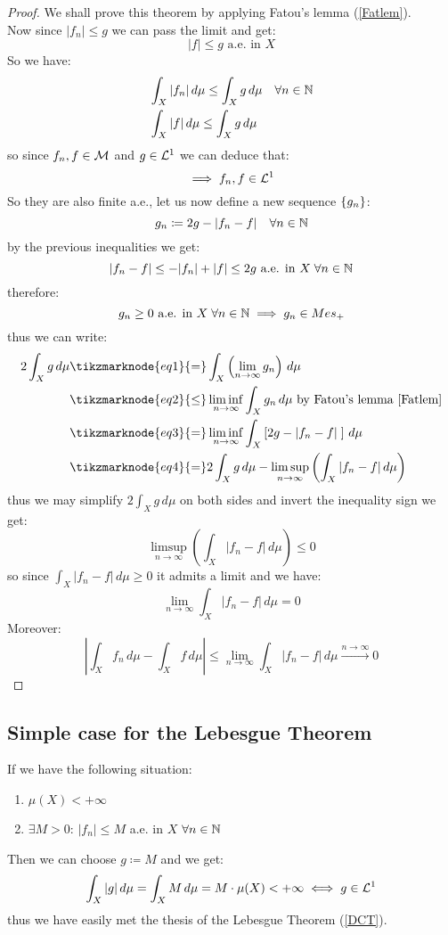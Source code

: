 \begin{proof}
    We shall prove this theorem by applying  Fatou's lemma (\ref{Fatlem}). \\
    Now since $|f_n| \leq g$ we can pass the limit and get:
    \[
        |f| \leq g \text{ a.e. in } X
    \]
    So we have:
    \begin{align*}
        & \int_X |f_n| \, d\mu \leq \int_X g \, d\mu \quad \forall n \in \mathbb{N} \\
        & \int_X |f| \, d\mu \leq \int_X g \, d\mu
    \end{align*}
    so since $f_n,f\in\mathcal{M}$ and $g\in\mathcal{L}^1$ we can deduce that:
    \[
        \implies f_n,f\in\mathcal{L}^1    
    \]
    So they are also finite a.e., let us now define  a new sequence $\{ g_n \}$:
    \[
        g_n \coloneqq 2g - |f_n -f | \quad \forall n \in \mathbb{N}  
    \]
    by the previous inequalities we get:
    \[
        |f_n -f | \leq - |f_n| + |f|\leq 2g \text{ a.e. in } X \; \forall n \in \mathbb{N}    
    \]
    therefore:
    \[
        g_n \geq 0 \text{ a.e. in } X \; \forall n \in \mathbb{N} \implies g_n \in Mes_+    
    \]
    thus we can write:
    \begin{align*}
        2 \int_X g \, d\mu & \tikzmarknode{eq1}{=} \int_X \left( \lim_{n\to\infty} g_n \right) \, d\mu \\
        & \tikzmarknode{eq2}{\leq} \liminf_{n\to\infty} \int_X g_n \, d\mu  \text{ by Fatou's lemma \ref{Fatlem}}\\
        & \tikzmarknode{eq3}{=} \liminf_{n\to\infty} \int_X \left[ 2g - |f_n -f | \; \right] \, d\mu \\
        & \tikzmarknode{eq4}{=} 2 \int_X g \, d\mu - \limsup_{n\to\infty}  \left( \int_X |f_n-f| \, d\mu \right) \\
    \end{align*} 
    thus we may simplify $2\int_X g \, d\mu$ on both sides and invert the inequality sign we get:
    \[
        \limsup_{n\to\infty}  \left( \int_X |f_n-f| \, d\mu \right) \leq 0
    \]
    so since $\int_X |f_n-f| \, d\mu \geq 0$ it admits a limit and we have:
    \[
        \lim_{n\to\infty} \int_X |f_n-f| \, d\mu = 0
    \]
    Moreover:
    \[
        \left| \int_X f_n \, d\mu - \int_X f \, d\mu \right| \leq \lim_{n\to\infty} \int_X |f_n-f| \, d\mu  \xrightarrow{n\to\infty} 0
    \]
\end{proof}

\subsection{Simple case for the Lebesgue Theorem}
If we have the following situation:
\begin{enumerate}
    \item $\mu(X) < + \infty$ 
    \item $\exists M > 0$:  $| f_n | \leq M$ a.e. in $X$ $\forall n \in \mathbb{N}$
\end{enumerate}
Then we can choose $g\coloneqq M$ and we get:
\[
    \int_X |g| \, d\mu = \int_X M \, d\mu = M \cdot \mu(X) < +\infty \iff g\in\mathcal{L}^1    
\]
thus we have easily met the thesis of the Lebesgue Theorem (\ref{DCT}).

